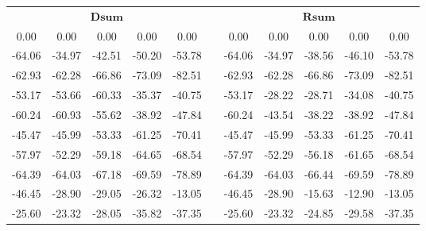 \documentclass[11pt,a4paper,openright,twoside]{article}
\begin{document}
\begin{table}[h!]
\centering
\begin{tabular}{ccccccccccc}
\multicolumn{5}{c}{$\mathbf{Dsum}$} & & \multicolumn{5}{c}{$\mathbf{Rsum}$}\\
\cline{1-5} \cline{7-11}
0.00 & 0.00 & 0.00 & 0.00 & 0.00 &  & 0.00 & 0.00 & 0.00 & 0.00 & 0.00\\
-64.06 & -34.97 & -42.51 & -50.20 & -53.78 & & -64.06 & -34.97 & -38.56 & -46.10 & -53.78\\
-62.93 & -62.28 & -66.86 & -73.09 & -82.51 & & -62.93 & -62.28 & -66.86 & -73.09 & -82.51\\
-53.17 & -53.66 & -60.33 & -35.37 & -40.75 & & -53.17 & -28.22 & -28.71 & -34.08 & -40.75\\
-60.24 & -60.93 & -55.62 & -38.92 & -47.84 & & -60.24 & -43.54 & -38.22 & -38.92 & -47.84\\
-45.47 & -45.99 & -53.33 & -61.25 & -70.41 & & -45.47 & -45.99 & -53.33 & -61.25 & -70.41\\
-57.97 & -52.29 & -59.18 & -64.65 & -68.54 & & -57.97 & -52.29 & -56.18 & -61.65 & -68.54\\
-64.39 & -64.03 & -67.18 & -69.59 & -78.89 & & -64.39 & -64.03 & -66.44 & -69.59 & -78.89\\
-46.45 & -28.90 & -29.05 & -26.32 & -13.05 & & -46.45 & -28.90 & -15.63 & -12.90 & -13.05\\
-25.60 & -23.32 & -28.05 & -35.82 & -37.35 & & -25.60 & -23.32 & -24.85 & -29.58 & -37.35
\end{tabular}
\end{table}
\end{document}
